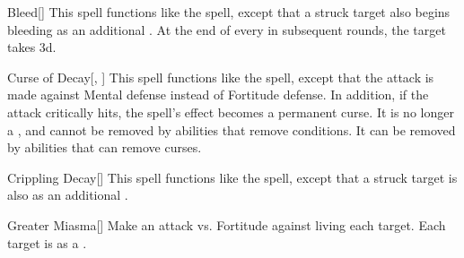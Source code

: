 \lowercase{\hypertarget{spell:Bleed}{}}\label{spell:Bleed}
\begin{freeability}[Rank 5]{\hypertarget{spell:Bleed}{Bleed}}[]
This spell functions like the  spell, except that a struck target also begins bleeding as an additional .
At the end of every  in subsequent rounds, the target takes  \minus3d.
\end{freeability}
\vspace{0.25em}



\lowercase{\hypertarget{spell:Curse of Decay}{}}\label{spell:Curse of Decay}
\begin{freeability}[Rank 5]{\hypertarget{spell:Curse of Decay}{Curse of Decay}}[, ]
This spell functions like the  spell, except that the attack is made against Mental defense instead of Fortitude defense.
In addition, if the attack critically hits, the spell's effect becomes a permanent curse.
It is no longer a , and cannot be removed by abilities that remove conditions.
It can be removed by abilities that can remove curses.
\end{freeability}
\vspace{0.25em}



\lowercase{\hypertarget{spell:Crippling Decay}{}}\label{spell:Crippling Decay}
\begin{freeability}[Rank 6]{\hypertarget{spell:Crippling Decay}{Crippling Decay}}[]
This spell functions like the  spell, except that a struck target is also  as an additional .
\end{freeability}
\vspace{0.25em}



\lowercase{\hypertarget{spell:Greater Miasma}{}}\label{spell:Greater Miasma}
\begin{freeability}[Rank 6]{\hypertarget{spell:Greater Miasma}{Greater Miasma}}[]
Make an attack vs. Fortitude against living each target.
\hit Each target is  as a .
\end{freeability}
\vspace{0.25em}



